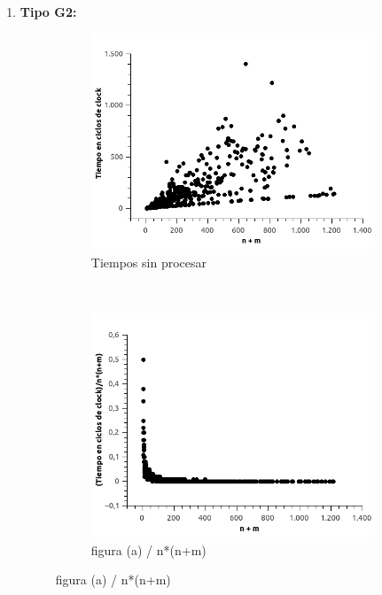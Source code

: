 \begin{enumerate}
\begin{figure}[H]
\end{figure}



\item \textbf{Tipo G2:}

\begin{figure}[H]
        \centering
        \begin{subfigure}[b]{0.5\textwidth}
                \includegraphics[width=\textwidth]{imagenes/ejer4-grafG2-1.jpg}
                \caption{Tiempos sin procesar}
        \end{subfigure}%
        ~ %
        \begin{subfigure}[b]{0.5\textwidth}
                \includegraphics[width=\textwidth]{imagenes/ejer4-grafG2-2.jpg}
                \caption{figura (a) / n*(n+m)}
        \end{subfigure}

\end{figure}


\end{enumerate}

